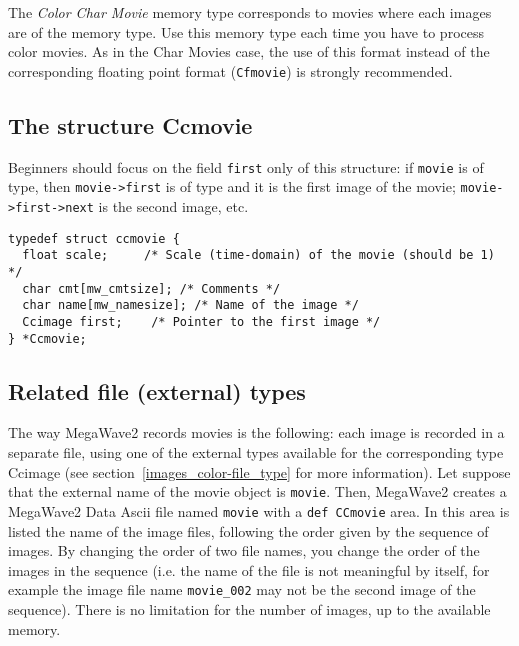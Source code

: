 The {\em Color Char Movie} memory type corresponds to movies where each images
are of the \ccimage memory type. 
Use this memory type each time you have to process color movies.
As in the Char Movies case, the use of this format instead of the corresponding floating point format (\verb+Cfmovie+) is strongly recommended.

\subsection{The structure Ccmovie}
\label{movies_color-char-movies_structure}

 Beginners should focus on the field \verb+first+ only of this structure:
if \verb+movie+ is of \ccmovie type, then \verb+movie->first+ is of \ccimage
type and it is the first image of the movie; \verb+movie->first->next+ is
the second image, etc.

{\small
\begin{verbatim}
typedef struct ccmovie {
  float scale;     /* Scale (time-domain) of the movie (should be 1) */
  char cmt[mw_cmtsize]; /* Comments */
  char name[mw_namesize]; /* Name of the image */
  Ccimage first;    /* Pointer to the first image */
} *Ccmovie;
\end{verbatim}
}

\subsection{Related file (external) types}
\label{movies_color-char-file_type}

The way MegaWave2 records movies is the following:
each image is recorded in a separate file, using one of the external types available for the corresponding type Ccimage (see section~\ref{images_color-file_type} for more information).
Let suppose that the external name of the movie object is \verb+movie+.
Then, MegaWave2 creates a MegaWave2 Data Ascii file named \verb+movie+ with a \verb+def CCmovie+ area.
In this area is listed the name of the image files, following the order given by the sequence of images.
By changing the order of two file names, you change the order of the images in the sequence (i.e. the name of
the file is not meaningful by itself, for example the image file name \verb+movie_002+ may not be the second
image of the sequence).
There is no limitation for the number of images, up to the available memory.

